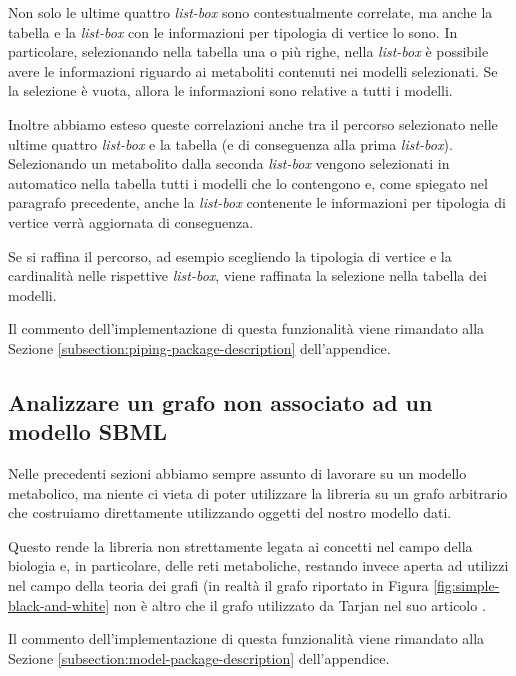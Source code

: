 Non solo le ultime quattro \emph{list-box} sono contestualmente
correlate, ma anche la tabella e la \emph{list-box} con le
informazioni per tipologia di vertice lo sono. In particolare,
selezionando nella tabella una o pi\`u righe, nella \emph{list-box}
\`e possibile avere le informazioni riguardo ai metaboliti contenuti
nei modelli selezionati. Se la selezione \`e vuota, allora le
informazioni sono relative a tutti i modelli.

Inoltre abbiamo esteso queste correlazioni anche tra il percorso
selezionato nelle ultime quattro \emph{list-box} e la tabella (e di
conseguenza alla prima \emph{list-box}). Selezionando un metabolito
dalla seconda \emph{list-box} vengono selezionati in automatico nella
tabella tutti i modelli che lo contengono e, come spiegato nel
paragrafo precedente, anche la \emph{list-box} contenente le
informazioni per tipologia di vertice verr\`a aggiornata di
conseguenza.

Se si raffina il percorso, ad esempio scegliendo la tipologia di
vertice e la cardinalit\`a nelle rispettive \emph{list-box}, viene
raffinata la selezione nella tabella dei modelli.

Il commento dell'implementazione di questa funzionalit\`a viene
rimandato alla Sezione \ref{subsection:piping-package-description}
dell'appendice.

\subsection{Analizzare un grafo non associato ad un modello SBML}
Nelle precedenti sezioni abbiamo sempre assunto di lavorare su un
modello metabolico, ma niente ci vieta di poter utilizzare la libreria
su un grafo arbitrario che costruiamo direttamente utilizzando oggetti
del nostro modello dati.

Questo rende la libreria non strettamente legata ai concetti nel campo
della biologia e, in particolare, delle reti metaboliche, restando
invece aperta ad utilizzi nel campo della teoria dei grafi (in
realt\`a il grafo riportato in Figura \ref{fig:simple-black-and-white}
non \`e altro che il grafo utilizzato da Tarjan nel suo articolo
\cite{Tarjan}.

Il commento dell'implementazione di questa funzionalit\`a viene
rimandato alla Sezione \ref{subsection:model-package-description}
dell'appendice.


